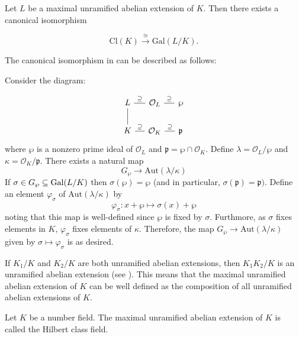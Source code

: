 
\begin{theorem}
    Let $L$ be a maximal unramified abelian extension of $K$. Then there exists a canonical isomorphism

    \[\textrm{Cl}(K)\xrightarrow{\cong} \textrm{Gal}(L/K).\]

\end{theorem}

The canonical isomorphism in  can be described as follows:

Consider the diagram:

    \[\begin{tikzcd}[column sep=small]
        \label{setup}
        L & \lar[dash, "\supseteq"'] \mathcal{O}_{L} & \lar[dash, "\supseteq"']\wp\\
        K \uar[dash] & \lar[dash, "\supseteq"']\mathcal{O}_{K} &\lar[dash, "\supseteq"']\mathfrak{p}
    \end{tikzcd}\]
where $\wp$ is a nonzero prime ideal of $\mathcal{O}_{L}$ and $\mathfrak{p} = \wp \cap \mathcal{O}_{K}$. Define $\lambda = \mathcal{O}_{L}/\wp$ and $\kappa = \mathcal{O}_{K}/\mathfrak{p}$. There exists a natural map
    \[G_\wp \to \textrm{Aut}(\lambda/\kappa)\]
If $\sigma \in G_\wp \subseteq \textrm{Gal}(L/K)$ then $\sigma(\wp) = \wp$ (and in particular, $\sigma(\mathfrak{p}) = \mathfrak{p})$. Define an element $\varphi_\sigma$ of $\textrm{Aut}(\lambda/\kappa)$ by
    \[\varphi_\sigma: x + \wp \mapsto \sigma(x) + \wp\]
noting that this map is well-defined since $\wp$ is fixed by $\sigma$. Furthmore, as $\sigma$ fixes elements in $K$, $\varphi_\sigma$ fixes elements of $\kappa$. Therefore, the map $G_\wp \to \textrm{Aut}(\lambda/\kappa)$ given by $\sigma \mapsto \varphi_\sigma$ is as desired.


If $K_1/K$ and $K_2/K$ are both unramified abelian extensions, then $K_1K_2/K$ is an unramified abelian extension (see ). This means that the maximal unramified abelian extension of $K$ can be well defined as the composition of all unramified abelian extensions of $K$.

\begin{definition}
    Let $K$ be a number field. The maximal unramified abelian extension of $K$ is called the Hilbert class field.
\end{definition}

